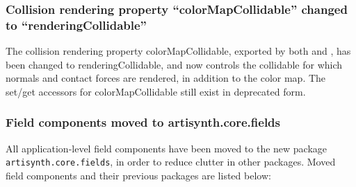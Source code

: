 \documentclass{article}
\begin{document}
\subsubsection{Collision rendering property ``colorMapCollidable''
changed to ``renderingCollidable''}

The collision rendering property {\sf colorMapCollidable}, exported by both
 and
, has been
changed to {\sf renderingCollidable}, and now controls the collidable
for which normals and contact forces are rendered, in addition to the
color map. The set/get accessors for {\sf colorMapCollidable} still
exist in deprecated form.

\subsubsection{Field components moved to artisynth.core.fields}

All application-level field components have been moved to the new
package {\tt artisynth.core.fields}, in order to reduce clutter in
other packages. Moved field components and their previous
packages are listed below:
\end{document}
